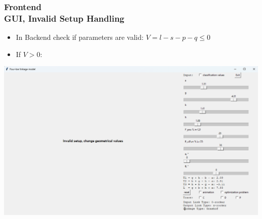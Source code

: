 \documentclass[ucs,10pt]{beamer}
\begin{document}
\begin{frame}[fragile]
\frametitle{Frontend \\
	\small \color{rwth-blue} GUI, Invalid Setup Handling}
	\begin{itemize}
		\item In Backend check if parameters are valid: $V = l - s - p - q \leq 0$
		\item If $V > 0$:
	\end{itemize}
	\begin{center}
		\includegraphics[width=0.95\linewidth]{./Figures/Implementation/invalid_setup.png}
	\end{center}
\end{frame}

\end{document}
